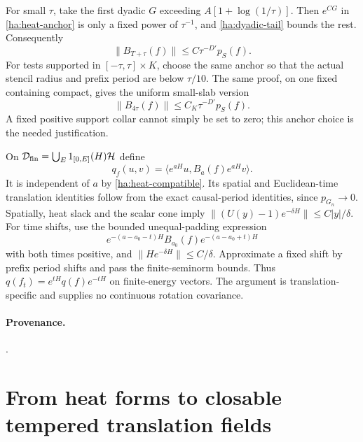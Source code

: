 For small $\tau$, take the first dyadic $G$ exceeding
$A[1+\log(1/\tau)]$.  Then $e^{CG}$ in
\eqref{ha:heat-anchor} is only a fixed power of $\tau^{-1}$, and
\eqref{ha:dyadic-tail} bounds the rest.  Consequently
\begin{equation}
 \|B_{T+\tau}(f)\|\leq C\tau^{-D'}p_S(f).
 \label{ha:heat-bound}
\end{equation}
For tests supported in $[-\tau,\tau]\times K$, choose the same anchor
so that the actual stencil radius and prefix period are below $\tau/10$.
The same proof, on one fixed containing compact, gives the uniform
small-slab version
\begin{equation}
 \|B_{4\tau}(f)\|\leq C_K\tau^{-D'}p_S(f).
 \label{ha:small-slab}
\end{equation}
A fixed positive support collar cannot simply be set to zero; this
anchor choice is the needed justification.

On $\mathcal D_{\rm fin}=\bigcup_E1_{[0,E]}(H)\mathcal H$ define
\begin{equation}
 q_f(u,v)=\langle e^{aH}u,B_a(f)e^{aH}v\rangle.
 \label{ha:heat-form}
\end{equation}
It is independent of $a$ by \eqref{ha:heat-compatible}.  Its spatial and
Euclidean-time translation identities follow from the exact causal-period
identities, since $p_{G_n}\to0$.  Spatially, heat slack and the scalar
cone imply $\|(U(y)-1)e^{-\delta H}\|\leq C|y|/\delta$.
For time shifts, use the bounded unequal-padding expression
\begin{equation}
 e^{-(a-a_0-t)H}B_{a_0}(f)e^{-(a-a_0+t)H}
 \label{ha:unequal-padding}
\end{equation}
with both times positive, and
$\|He^{-\delta H}\|\leq C/\delta$.  Approximate a fixed shift by prefix
period shifts and pass the finite-seminorm bounds.  Thus
$q(f_t)=e^{tH}q(f)e^{-tH}$ on finite-energy vectors.  The argument is
translation-specific and supplies no continuous rotation covariance.

\paragraph{Provenance.}
.

\section{From heat forms to closable tempered translation fields}
\label{ha:operator}

